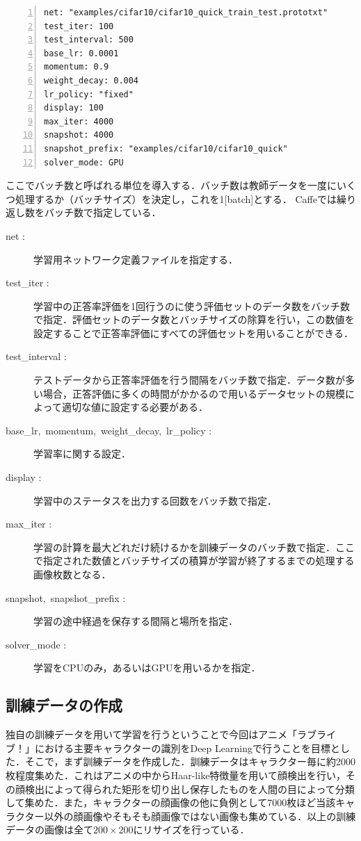 \documentclass[a4paper,10pt]{jsarticle}
\begin{document}
\begin{lstlisting}[basicstyle=\ttfamily\footnotesize, frame=single, firstnumber=1, numbers=left, breaklines=true]
net: "examples/cifar10/cifar10_quick_train_test.prototxt"
test_iter: 100
test_interval: 500
base_lr: 0.0001
momentum: 0.9
weight_decay: 0.004
lr_policy: "fixed"
display: 100
max_iter: 4000
snapshot: 4000
snapshot_prefix: "examples/cifar10/cifar10_quick"
solver_mode: GPU
\end{lstlisting}

ここでバッチ数と呼ばれる単位を導入する．バッチ数は教師データを一度にいくつ処理するか（バッチサイズ）を決定し，これを1[batch]とする．
Caffeでは繰り返し数をバッチ数で指定している．

\begin{description}
  \item[net :]学習用ネットワーク定義ファイルを指定する．
  \item[test\_iter :]学習中の正答率評価を1回行うのに使う評価セットのデータ数をバッチ数で指定．評価セットのデータ数とバッチサイズの除算を行い，この数値を設定することで正答率評価にすべての評価セットを用いることができる．
  \item[test\_interval :]テストデータから正答率評価を行う間隔をバッチ数で指定．データ数が多い場合，正答評価に多くの時間がかかるので用いるデータセットの規模によって適切な値に設定する必要がある．
  \item[base\_lr,\ momentum,\ weight\_decay,\ lr\_policy :]学習率に関する設定．
  \item[display :]学習中のステータスを出力する回数をバッチ数で指定．
  \item[max\_iter :]学習の計算を最大どれだけ続けるかを訓練データのバッチ数で指定．ここで指定された数値とバッチサイズの積算が学習が終了するまでの処理する画像枚数となる．
  \item[snapshot,\ snapshot\_prefix :]学習の途中経過を保存する間隔と場所を指定．
  \item[solver\_mode :]学習をCPUのみ，あるいはGPUを用いるかを指定．
\end{description}

\subsection{訓練データの作成}
独自の訓練データを用いて学習を行うということで今回はアニメ「ラブライブ！」における主要キャラクターの識別をDeep Learningで行うことを目標とした．そこで，まず訓練データを作成した．訓練データはキャラクター毎に約2000枚程度集めた．これはアニメの中からHaar-like特徴量を用いて顔検出を行い，その顔検出によって得られた矩形を切り出し保存したものを人間の目によって分類して集めた．また，キャラクターの顔画像の他に負例として7000枚ほど当該キャラクター以外の顔画像やそもそも顔画像ではない画像も集めている．以上の訓練データの画像は全て$200\times200$にリサイズを行っている．
\end{document}
